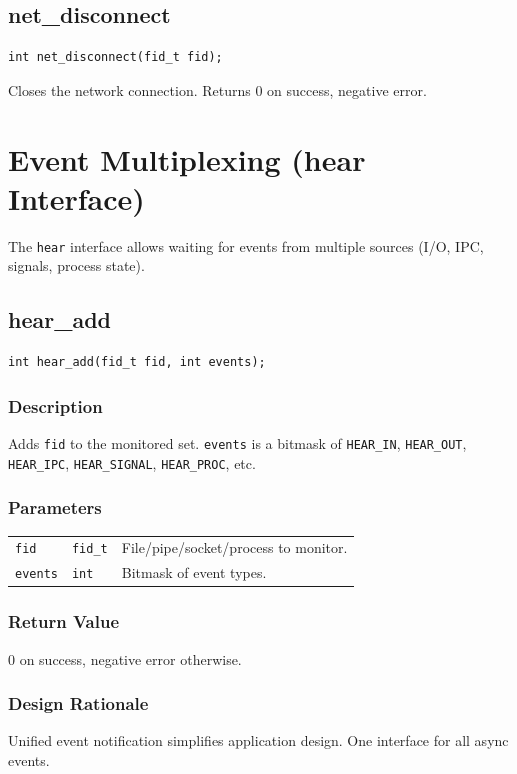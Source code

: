 \documentclass[12pt,a4paper]{article}
\begin{document}
\subsection{net\_disconnect}
\begin{lstlisting}
int net_disconnect(fid_t fid);
\end{lstlisting}
Closes the network connection. Returns 0 on success, negative error.

\section{Event Multiplexing (hear Interface)}
\label{sec:hear}

The \texttt{hear} interface allows waiting for events from multiple sources (I/O, IPC, signals, process state).

\subsection{hear\_add}
\begin{lstlisting}
int hear_add(fid_t fid, int events);
\end{lstlisting}

\subsubsection{Description}
Adds \texttt{fid} to the monitored set. \texttt{events} is a bitmask of \texttt{HEAR\_IN}, \texttt{HEAR\_OUT}, \texttt{HEAR\_IPC}, \texttt{HEAR\_SIGNAL}, \texttt{HEAR\_PROC}, etc.

\subsubsection{Parameters}
\begin{tabularx}{\textwidth}{|l|l|X|}
\hline
\verb|fid| & \verb|fid_t| & File/pipe/socket/process to monitor. \\
\verb|events| & \verb|int| & Bitmask of event types. \\
\hline
\end{tabularx}

\subsubsection{Return Value}
0 on success, negative error otherwise.

\subsubsection{Design Rationale}
Unified event notification simplifies application design. One interface for all async events.
\end{document}
